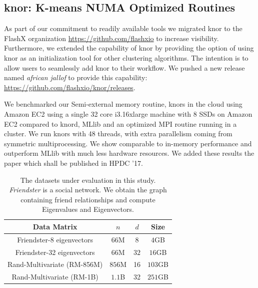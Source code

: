 \documentclass[simplex.tex]{subfiles}
\begin{document}
\subsection{knor: K-means NUMA Optimized Routines}


As part of our commitment to readily available tools
we migrated \textsf{knor} to the FlashX organization
\href{https://github.com/flashxio}{https://github.com/flashxio} to increase
visibility. Furthermore, we extended the capability of \textsf{knor} by
providing the option of using \textsf{knor} as an initialization tool
for other clustering algorithms. The intention is to allow users to
seamlessly add \textsf{knor} to their workflow.
We pushed a new release named \textit{african jallof} to
provide this capability: \\
\href{https://github.com/flashxio/knor/releases}
{https://github.com/flashxio/knor/releases}.

We benchmarked our Semi-external memory routine, \textsf{knors} in the cloud
using Amazon EC2 using a single 32 core i3.16xlarge machine with 8 SSDs on Amazon EC2 compared
to \textsf{knord}, MLlib and an optimized MPI routine running in a cluster.
We run \textsf{knors} with 48 threads, with extra parallelism coming
from symmetric multiprocessing. We show comparable to in-memory
performance and outperform MLlib with much less hardware resources.
We added these results the paper which shall be published in HPDC '17.

\begin{table}[!htb]
    \caption{The datasets under evaluation in this study. \textit{Friendster}
        is a social network. We obtain the graph containing friend relationships and
compute Eigenvalues and Eigenvectors.}
\vspace{-10pt}
\begin{center}
\footnotesize
\begin{tabular}{|c|c|c|c|}
\hline
\textbf{Data Matrix} & $n$ & $d$ & \textbf{Size}\\
\hline
Friendster-8 eigenvectors & $66$M &
  $8$ & $4$GB\\
\hline
Friendster-32 eigenvectors & $66$M &
  $32$ & $16$GB\\
\hline
Rand-Multivariate (RM-856M)& $856$M & 16 & $103$GB\\
\hline
Rand-Multivariate (RM-1B)& $1.1$B & 32 & $251$GB\\
\hline
\end{tabular}
\normalsize
\end{center}
\label{tbl:matrices}
\end{table}
\end{document}
